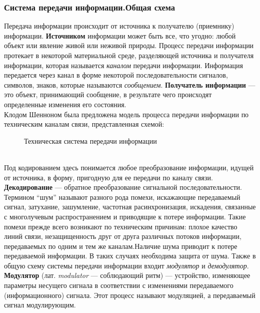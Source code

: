 \subsubsection{Система передачи информации.Общая схема}
Передача информации происходит от источника к получателю (приемнику) информации. {\bf Источником} информации может быть все, что угодно: любой объект или явление живой или неживой природы. Процесс передачи информации протекает в некоторой материальной среде, разделяющей источника и получателя информации, которая называется {\it каналом} передачи информации. Информация передается через канал в форме некоторой последовательности сигналов, символов, знаков, которые называются {\it сообщением}. {\bf Получатель информации} — это объект, принимающий сообщение, в результате чего происходят определенные изменения его состояния.\\
Клодом Шенноном была предложена модель процесса передачи информации по техническим каналам связи, представленная схемой:
\begin{figure}[h]
\caption{Техническая система передачи информации}
\label{fig:image}
\end{figure} \\\indent
Под кодированием здесь понимается любое преобразование информации, идущей от источника, в форму, пригодную для ее передачи по каналу связи. {\bf Декодирование} — обратное преобразование сигнальной последовательности.\\\indent
Термином “шум” называют разного рода помехи, искажающие передаваемый сигнал, затухание, зашумление, частотная расинхронизация, искадения, связанные с многолучевым распространением и приводящие к потере информации. Такие помехи прежде всего возникают по техническим причинам: плохое качество линий связи, незащищенность друг от друга различных потоков информации, передаваемых по одним и тем же каналам.Наличие шума приводит к потере передаваемой информации. В таких случаях необходима защита от шума.  
Также в общую схему системы передачи информации входит {\it модулятор} и {\it демодулятор}.\\\indent
{\bf Модулятор} (лат. {\it modulator} — соблюдающий ритм) — устройство, изменяющее параметры несущего сигнала в соответствии с изменениями передаваемого (информационного) сигнала. Этот процесс называют модуляцией, а передаваемый сигнал модулирующим.

